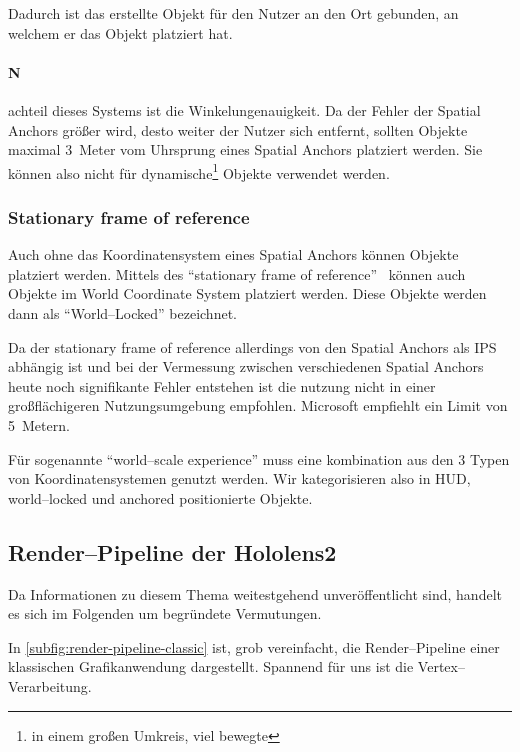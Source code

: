         Dadurch ist das erstellte Objekt für den Nutzer an den Ort gebunden, an welchem er das Objekt platziert hat.

        \paragraph{N}achteil dieses Systems ist die Winkelungenauigkeit.
            Da der Fehler der Spatial Anchors größer wird, desto weiter der Nutzer sich entfernt, sollten Objekte maximal 3~Meter vom Uhrsprung eines Spatial Anchors platziert werden.
            Sie können also nicht für dynamische\footnote{in einem großen Umkreis, viel bewegte} Objekte verwendet werden.

    \subsubsection{Stationary frame of reference}\label{subsubsec:stationary-frame-of-reference}
        Auch ohne das Koordinatensystem eines Spatial Anchors können Objekte platziert werden.
        Mittels des \enquote{stationary frame of reference}~\autocite{thetuvix-2023A} können auch Objekte im World Coordinate System platziert werden.
        Diese Objekte werden dann als \enquote{World--Locked} bezeichnet.

        Da der stationary frame of reference allerdings von den Spatial Anchors als IPS abhängig ist und bei der Vermessung zwischen verschiedenen Spatial Anchors heute noch signifikante Fehler entstehen ist die nutzung nicht in einer großflächigeren Nutzungsumgebung empfohlen.
        Microsoft empfiehlt ein Limit von 5~Metern.

        Für sogenannte \enquote{world--scale experience} muss eine kombination aus den 3 Typen von Koordinatensystemen genutzt werden.
        Wir kategorisieren also in HUD, world--locked und anchored positionierte Objekte.

\subsection{Render--Pipeline der Hololens2}\label{subsec:renderpipeline-der-hololens2}
    Da Informationen zu diesem Thema weitestgehend unveröffentlicht sind, handelt es sich im Folgenden um begründete Vermutungen.

    In \autoref{subfig:render-pipeline-classic} ist, grob vereinfacht, die Render--Pipeline einer klassischen Grafikanwendung dargestellt.
    Spannend für uns ist die Vertex--Verarbeitung.

